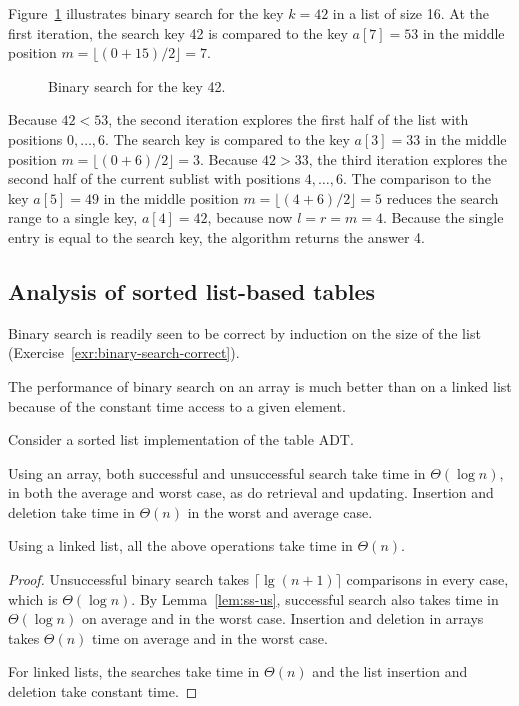 \begin{Example}
\label{eg:binsearch}
Figure~\ref{bsear-ex} illustrates binary search for
the key $k=42$ in a list of size 16. At the
first iteration, the search key 42 is compared to the 
key $a[7]  = 53$ in the middle position
$m=\lfloor (0+15)/2 \rfloor = 7$. 

\begin{figure}[htb!]
\centerline{
}
\caption{\label{bsear-ex} Binary search for the key 42.}
\end{figure}

Because $42 < 53$, the
second iteration explores the first half of the list
with positions $0,\ldots,6$. The search key is compared
to the key $a[3] = 33$ in the middle position
$m=\lfloor (0+6)/2 \rfloor = 3$. Because $42 > 33$, the
third iteration explores the second half of the current
sublist with positions $4,\ldots,6$. The comparison
to the key $a[5] = 49$ in the middle
position $m=\lfloor (4+6)/2 \rfloor = 5$ reduces the
search range to a single key, $a[4] = 42$,
because now $l = r = m = 4$. 
Because the single entry is equal to the search key, the
algorithm returns the answer 4.
\end{Example}


\subsection{Analysis of sorted list-based tables}
\label{sec:binsearch}

Binary search is readily seen to be correct by induction on the size of the list
(Exercise~\ref{exr:binary-search-correct}). 

The performance of binary search on an array is much better than on a linked list
because of the constant time access to a given element.

\begin{Lemma}
Consider a sorted list implementation of the table ADT.

Using an array, both successful and unsuccessful search take time in 
$\Theta(\log n)$, in both the average and worst case, as do retrieval and 
updating. Insertion and deletion take time in $\Theta(n)$ in the worst and 
average case.

Using a linked list, all the above operations take time in $\Theta(n)$. 
\end{Lemma}

\begin{proof}
Unsuccessful binary search takes $\lceil \lg (n+1)\rceil$ comparisons in 
every case, which is $\Theta(\log n)$. By Lemma~\ref{lem:ss-us}, 
successful search also takes time in $\Theta(\log n)$ on average and in the 
worst case. Insertion and deletion in arrays takes $\Theta(n)$ time on average 
and in the worst case.

For linked lists, the searches take time in $\Theta(n)$ and the list insertion 
and deletion take constant time.
\end{proof}

